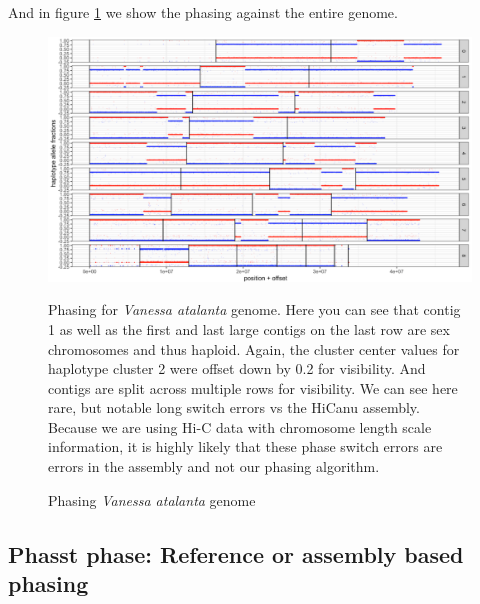 \par{And in figure \ref{figure:hicphasing2} we show the phasing against the entire genome.

\begin{figure}[htbp!]

\caption{Phasing \textit{Vanessa atalanta} genome}
\label{figure:hicphasing2}
\begin{centering}
\includegraphics[width=\textwidth]{hicphasing2.png}
\par{Phasing for \textit{Vanessa atalanta} genome. Here you can see that contig 1 as well as the first and last large contigs on the last row are sex chromosomes and thus haploid. Again, the cluster center values for haplotype cluster 2 were offset down by 0.2 for visibility. And contigs are split across multiple rows for visibility. We can see here rare, but notable long switch errors vs the HiCanu assembly. Because we are using Hi-C data with chromosome length scale information, it is highly likely that these phase switch errors are errors in the assembly and not our phasing algorithm. }
\end{centering}
\end{figure}

\subsection{Phasst phase: Reference or assembly based phasing}

}
